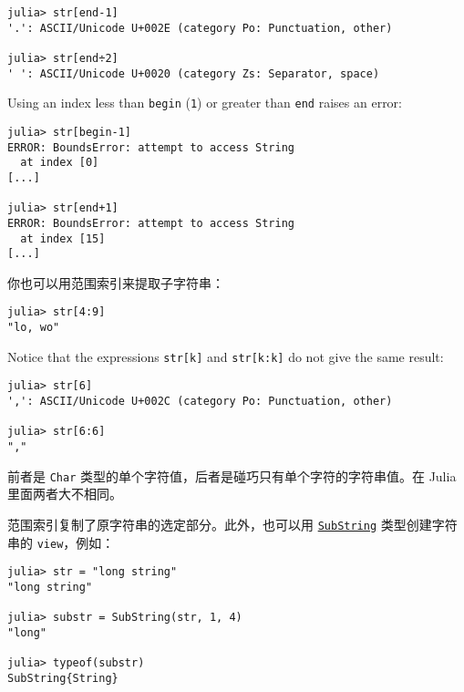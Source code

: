 \begin{verbatim}
julia> str[end-1]
'.': ASCII/Unicode U+002E (category Po: Punctuation, other)

julia> str[end÷2]
' ': ASCII/Unicode U+0020 (category Zs: Separator, space)
\end{verbatim}



Using an index less than \texttt{begin} (\texttt{1}) or greater than \texttt{end} raises an error:




\begin{verbatim}
julia> str[begin-1]
ERROR: BoundsError: attempt to access String
  at index [0]
[...]

julia> str[end+1]
ERROR: BoundsError: attempt to access String
  at index [15]
[...]
\end{verbatim}



你也可以用范围索引来提取子字符串：




\begin{verbatim}
julia> str[4:9]
"lo, wo"
\end{verbatim}



Notice that the expressions \texttt{str[k]} and \texttt{str[k:k]} do not give the same result:




\begin{verbatim}
julia> str[6]
',': ASCII/Unicode U+002C (category Po: Punctuation, other)

julia> str[6:6]
","
\end{verbatim}



前者是 \texttt{Char} 类型的单个字符值，后者是碰巧只有单个字符的字符串值。在 Julia 里面两者大不相同。



范围索引复制了原字符串的选定部分。此外，也可以用 \hyperlink{2624824381693370630}{\texttt{SubString}} 类型创建字符串的 \texttt{view}，例如：




\begin{verbatim}
julia> str = "long string"
"long string"

julia> substr = SubString(str, 1, 4)
"long"

julia> typeof(substr)
SubString{String}
\end{verbatim}



